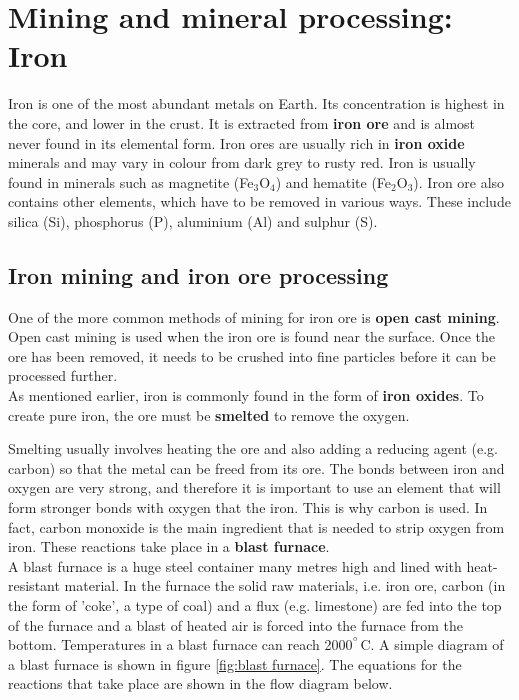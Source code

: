 



\section{Mining and mineral processing: Iron}
\label{sec:mining:iron}

Iron is one of the most abundant metals on Earth. Its concentration is highest in the core, and lower in the crust. It is extracted from \textbf{iron ore} and is almost never found in its elemental form. Iron ores are usually rich in \textbf{iron oxide} minerals and may vary in colour from dark grey to rusty red. Iron is usually found in minerals such as magnetite (Fe$_{3}$O$_{4}$) and hematite (Fe$_{2}$O$_{3}$). Iron ore also contains other elements, which have to be removed in various ways. These include silica (Si), phosphorus (P), aluminium (Al) and sulphur (S).

\subsection{Iron mining and iron ore processing}

One of the more common methods of mining for iron ore is \textbf{open cast mining}. Open cast mining is used when the iron ore is found near the surface. Once the ore has been removed, it needs to be crushed into fine particles before it can be processed further.\\

As mentioned earlier, iron is commonly found in the form of \textbf{iron oxides}. To create pure iron, the ore must be \textbf{smelted} to remove the oxygen.


Smelting usually involves heating the ore and also adding a reducing agent (e.g. carbon) so that the metal can be freed from its ore. The bonds between iron and oxygen are very strong, and therefore it is important to use an element that will form stronger bonds with oxygen that the iron. This is why carbon is used. In fact, carbon monoxide is the main ingredient that is needed to strip oxygen from iron. These reactions take place in a \textbf{blast furnace}.\\

A blast furnace is a huge steel container many metres high and lined with heat-resistant material. In the furnace the solid raw materials, i.e. iron ore, carbon (in the form of 'coke', a type of coal) and a flux (e.g. limestone) are fed into the top of the furnace and a blast of heated air is forced into the furnace from the bottom. Temperatures in a blast furnace can reach 2000$^{^{\circ}}$C. A simple diagram of a blast furnace is shown in figure \ref{fig:blast furnace}. The equations for the reactions that take place are shown in the flow diagram below. \\

